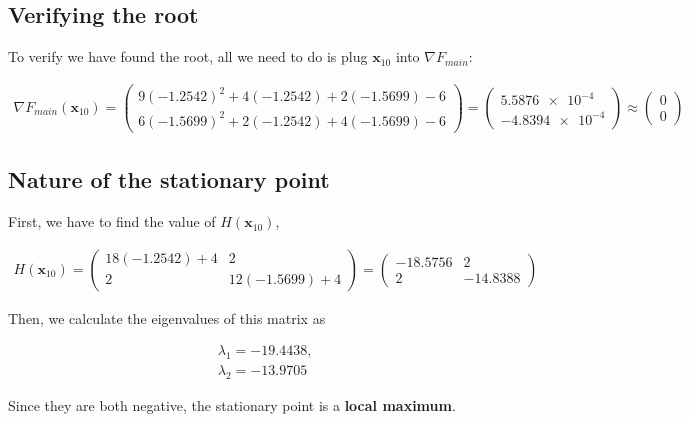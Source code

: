 \documentclass[../main.tex]{subfiles}
\begin{document}
    \subsection*{Verifying the root}
    To verify we have found the root, all we need to do is plug $\mathbf{x}_{10}$ into $\nabla F_{main}$:
    \begin{center*}
        \begin{align*}
            \nabla F_{main}(\mathbf{x}_{10}) = \begin{pmatrix}
                9(-1.2542)^{2} + 4(-1.2542) + 2(-1.5699) - 6 \\
                6(-1.5699)^{2} + 2(-1.2542) + 4(-1.5699) - 6
            \end{pmatrix} = \begin{pmatrix}
                \num{5.5876e-4} \\
                \num{-4.8394e-4}
            \end{pmatrix} \approx \begin{pmatrix}
                0 \\ 0
            \end{pmatrix}
        \end{align*}
    \end{center*}
    
    \subsection*{Nature of the stationary point}\label{subsec:2d-nr-stationary-point-nature}
    First, we have to find the value of $H(\mathbf{x}_{10})$,
    \begin{center*}
        \begin{align*}
            H(\mathbf{x}_{10}) = \begin{pmatrix}
                18(-1.2542) + 4 & 2 \\
                2 & 12(-1.5699) + 4
            \end{pmatrix} = \begin{pmatrix}
                -18.5756 & 2 \\
                2 & -14.8388
            \end{pmatrix}
        \end{align*}
    \end{center*}
    Then, we calculate the eigenvalues of this matrix as
    \begin{center*}
        \begin{align*}
            & \lambda_{1} = -19.4438, \\
            & \lambda_{2} = -13.9705
        \end{align*}
    \end{center*}
    Since they are both negative, the stationary point is a \textbf{local maximum}.
\end{document}
